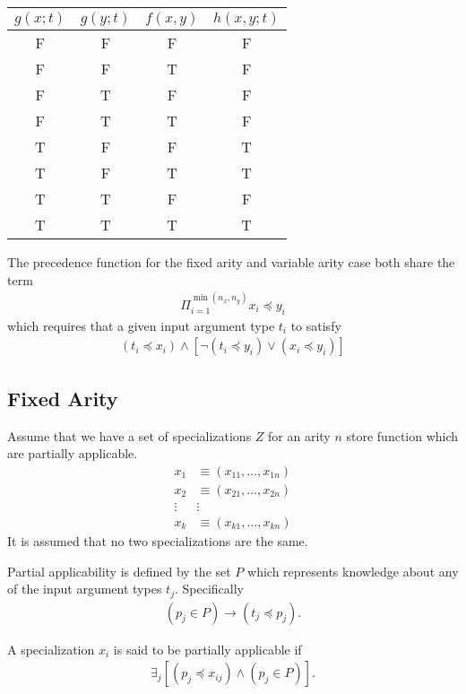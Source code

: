 \documentclass{article}
\begin{document}
\begin{table}[h]
\centering
\begin{tabular}{|c|c|c||c|}
\hline
$g(x;t)$ & $g(y;t)$ & $f(x,y)$ & $h(x,y;t)$ \\
\hline
F & F & F & F \\
F & F & T & F \\
F & T & F & F \\
F & T & T & F \\
T & F & F & T \\
T & F & T & T \\
T & T & F & F \\
T & T & T & T \\
\hline
\end{tabular}
\end{table}

The precedence function for the fixed arity and variable arity case
both share the term
\begin{align}
  \Pi_{i=1}^{\min(n_x,n_y)} x_i \preceq y_i
\end{align}
which requires that a given input argument type $t_i$ to satisfy
\begin{align}
  (t_i \preceq x_i) \land [\lnot (t_i \preceq y_i) \lor (x_i \preceq y_i)]
\end{align}


\subsection{Fixed Arity}
Assume that we have a set of specializations $Z$ for an arity $n$
store function which are partially applicable.
\begin{align}
  x_1 & \equiv (x_{11}, \dots, x_{1n}) \nonumber \\
  x_2 & \equiv (x_{21}, \dots, x_{2n}) \nonumber \\
  \vdots & \vdots                     \nonumber \\
  x_k & \equiv (x_{k1}, \dots, x_{kn}) \nonumber
\end{align}
It is assumed that no two specializations are the same.

Partial applicability is defined by the set $P$ which represents
knowledge about any of the input argument types $t_j$. Specifically
\begin{align}
  (p_j \in P) \rightarrow (t_j \preceq p_j)
.
\end{align}

A specialization $x_i$ is said to be partially applicable if
\begin{align}
  \exists_j \left[(p_j \preceq x_{ij}) \land (p_j \in P) \right]
.
\end{align}
\end{document}
